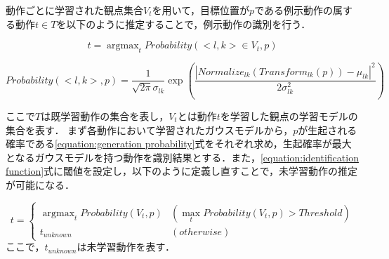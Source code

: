 動作ごとに学習された観点集合$V_{t}$を用いて，目標位置が$p$である例示動作の属する動作$t∈T$を以下のように推定することで，例示動作の識別を行う．

\begin{equation}
	\label{equation:identification function}
	t =  \mathop{\arg\max}_{t}Probability(<l , k>∈V_{t} , p)
\end{equation}

\begin{equation}
	\label{equation:generation probability}
	Probability(<l , k> , p) = \frac{1}{\sqrt{2\pi}σ_{lk}}\exp \left(\frac{|Normalize_{lk}(Transform_{lk}(p))-μ_{lk}|^2}{2σ_{lk}^2}\right)
\end{equation}

ここで$T$は既学習動作の集合を表し，$V_{t}$とは動作$t$を学習した観点の学習モデルの集合を表す．
まず各動作において学習されたガウスモデルから，$p$が生起される確率である\ref{equation:generation probability}式をそれぞれ求め，生起確率が最大となるガウスモデルを持つ動作を識別結果とする．また，\ref{equation:identification function}式に閾値を設定し，以下のように定義し直すことで，未学習動作の推定が可能になる．

\begin{equation}
	\label{equation:identification function2}
	t =
	\begin{cases}
		\mathop{\arg\max}_{t}Probability(V_{t} , p)		& (\mathop{\max}_{t}Probability(V_{t} , p) > Threshold) \\
		t_{unknown}					 			& (otherwise)
	\end{cases}	
\end{equation}
ここで，$t_{unknown}$は未学習動作を表す．
